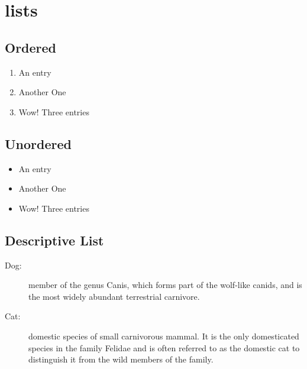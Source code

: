 \documentclass[twocolumn]{article}
\begin{document}
\section{lists}

\subsection{Ordered}
\begin{enumerate}
  \item An entry
  \item Another One
  \item Wow! Three entries
\end{enumerate}

\subsection{Unordered}
\begin{itemize}
  \item An entry
  \item Another One
  \item Wow! Three entries
\end{itemize}

\subsection{Descriptive List}
\begin{description}
\item[Dog:] member of the genus Canis, which forms part of the wolf-like canids,
  and is the most widely abundant terrestrial carnivore.
\item[Cat:] domestic species of small carnivorous mammal. It is the only
  domesticated species in the family Felidae and is often referred to as the
  domestic cat to distinguish it from the wild members of the family.
\end{description}
\end{document}
